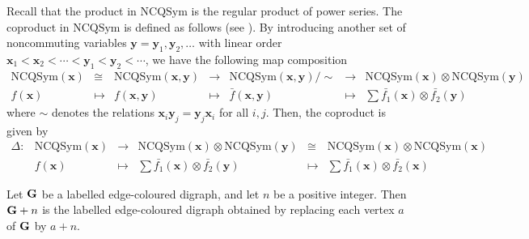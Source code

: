 \documentclass[11pt]{amsart}
\numberwithin{equation}{section}
\newcommand{\NCQSym}{\mathrm{NCQSym}}
\begin{document}
Recall that the product in $\NCQSym$ is the regular product of power series. The coproduct in $\NCQSym$ is defined as follows (see \cite{B09}). By introducing another set of noncommuting variables $\mathbf{y}=\mathbf{y}_1,\mathbf{y}_2,\dots$ with linear order $\mathbf{x}_1<\mathbf{x}_2<\cdots<\mathbf{y}_1<\mathbf{y}_2<\cdots$, we have the following map composition
$$\begin{array}{ccccccc}
	\NCQSym(\mathbf{x}) & \cong & \NCQSym(\mathbf{x},\mathbf{y}) & \to & \NCQSym(\mathbf{x},\mathbf{y})/\sim & \to & \NCQSym(\mathbf{x})\otimes\NCQSym(\mathbf{y})\\
	f(\mathbf{x}) & \mapsto & f(\mathbf{x},\mathbf{y}) & \mapsto & \bar{f}(\mathbf{x},\mathbf{y}) & \mapsto & \sum \bar{f_1}(\mathbf{x})\otimes \bar{f_2}(\mathbf{y})
\end{array}$$
where $\sim$ denotes the relations $\mathbf{x}_i\mathbf{y}_j=\mathbf{y}_j\mathbf{x}_i$ for all $i,j$. Then, the coproduct  is given by
$$\begin{array}{cccccc}
	\Delta: & \NCQSym(\mathbf{x}) & \to & \NCQSym(\mathbf{x})\otimes\NCQSym(\mathbf{y}) & \cong & \NCQSym(\mathbf{x})\otimes\NCQSym(\mathbf{x})\\
	& f(\mathbf{x}) & \mapsto & \sum \bar{f_1}(\mathbf{x})\otimes \bar{f_2}(\mathbf{y}) & \mapsto & \sum \bar{f_1}(\mathbf{x})\otimes \bar{f_2}(\mathbf{x})
\end{array}$$

Let $\bf G$ be a labelled edge-coloured digraph, and let $n$ be a positive integer. Then ${\bf G}+n$ is the labelled edge-coloured digraph obtained by replacing each vertex $a$ of $\bf G$ by $a+n$. 
%
\end{document}
